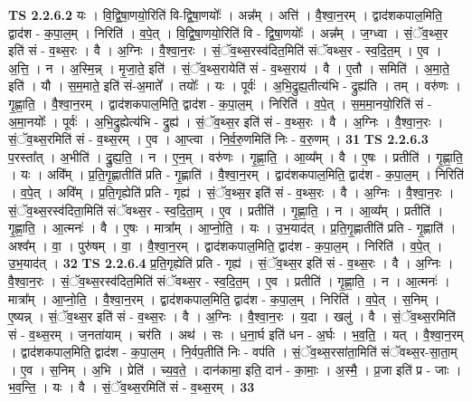 \documentclass[17pt]{extarticle}
\begin{document}
                  \newline
                                \textbf{ TS 2.2.6.2} \newline
                  यः । वि॒द्वि॒षा॒णयो॒रिति॑ वि-द्वि॒षा॒णयोः᳚ । अन्न᳚म् । अत्ति॑ । वै॒श्वा॒न॒रम् । द्वाद॑शकपाल॒मिति॒ द्वाद॑श - क॒पा॒ल॒म् । निरिति॑ । व॒पे॒त् । वि॒द्वि॒षा॒णयो॒रिति॑ वि - द्वि॒षा॒णयोः᳚ । अन्न᳚म् । ज॒ग्ध्वा । सं॒ॅव॒थ्स॒र इति॑ सं - व॒थ्स॒रः । वै । अ॒ग्निः । वै॒श्वा॒न॒रः । सं॒ॅव॒थ्स॒रस्व॑दित॒मिति॑ संॅवथ्स॒र - स्व॒दि॒त॒म् । ए॒व । अ॒त्ति॒ । न । अ॒स्मि॒न्न् । मृ॒जा॒ते॒ इति॑ । सं॒ॅव॒थ्स॒रायेति॑ सं - व॒थ्स॒राय॑ । वै । ए॒तौ । समिति॑ । अ॒मा॒ते॒ इति॑ । यौ । स॒म॒माते॒ इति॑ सं-अ॒माते᳚ । तयोः᳚ । यः । पूर्वः॑ । अ॒भि॒द्रुह्य॒तीत्य॑भि - द्रुह्य॑ति । तम् । वरु॑णः । गृ॒ह्णा॒ति॒ । वै॒श्वा॒न॒रम् । द्वाद॑शकपाल॒मिति॒ द्वाद॑श - क॒पा॒ल॒म् । निरिति॑ । व॒पे॒त् । स॒म॒मा॒नयो॒रिति॑ सं - अ॒मा॒नयोः᳚ । पूर्वः॑ । अ॒भि॒द्रुह्येत्य॑भि - द्रुह्य॑ । सं॒ॅव॒थ्स॒र इति॑ सं - व॒थ्स॒रः । वै । अ॒ग्निः । वै॒श्वा॒न॒रः । सं॒ॅव॒थ्स॒रमिति॑ सं - व॒थ्स॒रम् । ए॒व । आ॒प्त्वा । नि॒र्व॒रु॒णमिति॑ निः - व॒रु॒णम् । \textbf{  31} \newline
                  \newline
                                \textbf{ TS 2.2.6.3} \newline
                  प॒रस्ता᳚त् । अ॒भीति॑ । द्रु॒ह्य॒ति॒ । न । ए॒न॒म् । वरु॑णः । गृ॒ह्णा॒ति॒ । आ॒व्य᳚म् । वै । ए॒षः । प्रतीति॑ । गृ॒ह्णा॒ति॒ । यः । अवि᳚म् । प्र॒ति॒गृ॒ह्णातीति॑ प्रति - गृ॒ह्णाति॑ । वै॒श्वा॒न॒रम् । द्वाद॑शकपाल॒मिति॒ द्वाद॑श - क॒पा॒ल॒म् । निरिति॑ । व॒पे॒त् । अवि᳚म् । प्र॒ति॒गृह्येति॑ प्रति - गृह्य॑ । सं॒ॅव॒थ्स॒र इति॑ सं - व॒थ्स॒रः । वै । अ॒ग्निः । वै॒श्वा॒न॒रः । सं॒ॅव॒थ्स॒रस्व॑दिता॒मिति॑ संॅवथ्स॒र - स्व॒दि॒ता॒म् । ए॒व । प्रतीति॑ । गृ॒ह्णा॒ति॒ । न । आ॒व्य᳚म् । प्रतीति॑ । गृ॒ह्णा॒ति॒ । आ॒त्मनः॑ । वै । ए॒षः । मात्रा᳚म् । आ॒प्नो॒ति॒ । यः । उ॒भ॒याद॑त् । प्र॒ति॒गृ॒ह्णातीति॑ प्रति - गृ॒ह्णाति॑ । अश्व᳚म् । वा॒ । पुरु॑षम् । वा॒ । वै॒श्वा॒न॒रम् । द्वाद॑शकपाल॒मिति॒ द्वाद॑श - क॒पा॒ल॒म् । निरिति॑ । व॒पे॒त् । उ॒भ॒याद॑त् । \textbf{  32} \newline
                  \newline
                                \textbf{ TS 2.2.6.4} \newline
                  प्र॒ति॒गृह्येति॑ प्रति - गृह्य॑ । सं॒ॅव॒थ्स॒र इति॑ सं - व॒थ्स॒रः । वै । अ॒ग्निः । वै॒श्वा॒न॒रः । सं॒ॅव॒थ्स॒रस्व॑दित॒मिति॑ संॅवथ्स॒र - स्व॒दि॒त॒म् । ए॒व । प्रतीति॑ । गृ॒ह्णा॒ति॒ । न । आ॒त्मनः॑ । मात्रा᳚म् । आ॒प्नो॒ति॒ । वै॒श्वा॒न॒रम् । द्वाद॑शकपाल॒मिति॒ द्वाद॑श - क॒पा॒ल॒म् । निरिति॑ । व॒पे॒त् । स॒निम् । ए॒ष्यन्न् । सं॒ॅव॒थ्स॒र इति॑ सं - व॒थ्स॒रः । वै । अ॒ग्निः । वै॒श्वा॒न॒रः । य॒दा । खलु॑ । वै । सं॒ॅव॒थ्स॒रमिति॑ सं - व॒थ्स॒रम् । ज॒नता॑याम् । चर॑ति । अथ॑ । सः । ध॒ना॒र्घ इति॑ धन - अ॒र्घः । भ॒व॒ति॒॒ । यत् । वै॒श्वा॒न॒रम् । द्वाद॑शकपाल॒मिति॒ द्वाद॑श - क॒पा॒ल॒म् । नि॒र्वप॒तीति॑ निः - वप॑ति । सं॒ॅव॒थ्स॒रसा॑ता॒मिति॑ संॅवथ्स॒र-सा॒ता॒म् । ए॒व । स॒निम् । अ॒भि । प्रेति॑ । च्य॒व॒ते॒ । दान॑कामा॒ इति॒ दान॑ - का॒माः॒ । अ॒स्मै॒ । प्र॒जा इति॑ प्र - जाः । भ॒व॒न्ति॒ । यः । वै । सं॒ॅव॒थ्स॒रमिति॑ सं - व॒थ्स॒रम् । \textbf{  33} \newline
\end{document}
